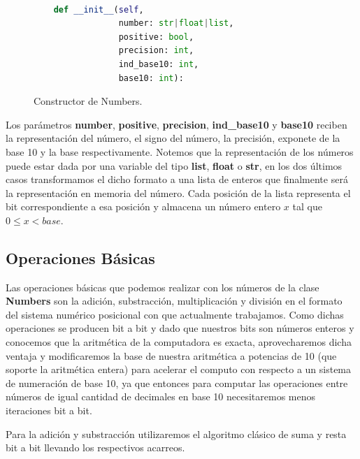 \documentclass[a4paper,10pt,twocolumn]{article}
\begin{document}
		\begin{figure}[htb]%
			\begin{lstlisting}[language=python]%

    def __init__(self, 
                 number: str|float|list,         
                 positive: bool, 
                 precision: int, 
                 ind_base10: int, 
                 base10: int):

			\end{lstlisting}
		\caption{Constructor de Numbers.\label{fig:code}}
		\end{figure}
	
	Los parámetros \textbf{number}, \textbf{positive}, \textbf{precision}, \textbf{ind\_base10} y \textbf{base10} 
  reciben la representación del número, el signo del número, la precisión, exponete de la base 10 y la base respectivamente. Notemos que la representación de los números puede estar dada por una variable del tipo \textbf{list}, \textbf{float} o \textbf{str}, en los dos últimos casos transformamos el dicho formato a  una lista de enteros que finalmente será la representación en memoria del número. Cada posición de la lista representa el bit correspondiente a esa posición y almacena un número entero $x$ tal que $0\leq x <base$.  
  
  
\subsection{Operaciones Básicas}\label{sub:basic operations}

	Las operaciones básicas que podemos realizar con los números de la clase \textbf{Numbers} son la adición, substracción, multiplicación y división en el formato del sistema numérico posicional con que actualmente trabajamos. Como dichas operaciones se producen bit a bit y dado que nuestros bits son números enteros y conocemos que la aritmética de la computadora es exacta, aprovecharemos dicha ventaja y modificaremos la base de nuestra aritmética a potencias de 10 (que soporte la aritmética entera) para acelerar el computo con respecto a un sistema de numeración de base 10, ya que entonces para computar las operaciones entre números de igual cantidad de decimales en base 10 necesitaremos menos iteraciones bit a bit.
  
	Para la adición y substracción utilizaremos el algoritmo clásico de suma y resta bit a bit llevando los respectivos acarreos.
\end{document}
